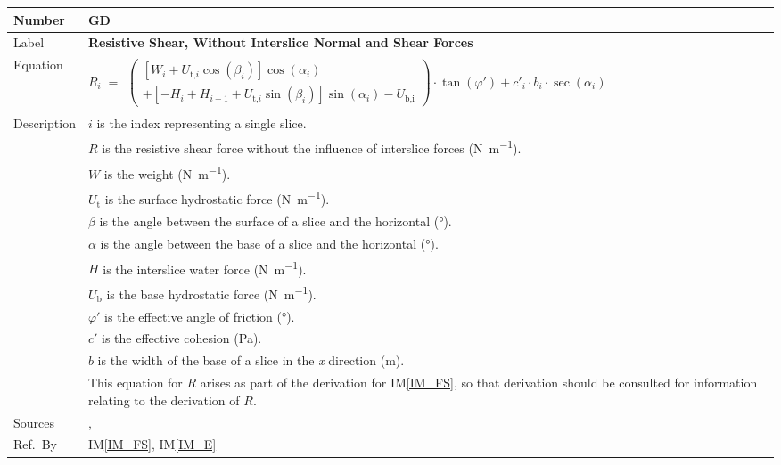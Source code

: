 \documentclass[12pt]{article}
\newcommand{\colAwidth}{0.13\textwidth}
\newcommand{\colBwidth}{0.82\textwidth}
\renewcommand{\arraystretch}{1}
\newcommand{\iref}[1]{IM\ref{#1}}
\newcounter{defnum} %
\begin{document}
\noindent
\begin{minipage}{\textwidth}
	\renewcommand*{\arraystretch}{1.5}
	\begin{tabular}{| p{\colAwidth} | p{\colBwidth} |}
		
		\hline \rowcolor[gray]{0.9} Number&
		GD{defnum}\thedefnum \label{GD_R}\\
		
		\hline Label& \bf Resistive Shear, Without Interslice Normal and Shear 
		Forces \\
		
		\hline
		Equation & 
		$R_i \; = \begin{array}{l}
		\left( \begin{array}{l}
		\left[ W_{i} + U_{\text{t,}i}
		\cos\left(\beta_{i}\right) \right]
		\cos\left(\alpha_{i}\right) \\
		+ \left[ - H_{i} + H_{i-1} +
		U_{\text{t,}i} \sin\left(\beta_{i}\right) \right]
		\sin\left(\alpha_{i}\right) - U_{\text{b,i}} \end{array}
		\right) \cdot \tan\left(\varphi'\right)
		+ c'_{i} \cdot b_{i} \cdot
		\sec\left(\alpha_{i}\right) \end{array} $\\
		
		\hline Description &$i$ is the index representing a single slice.\\
		&$R$ is the resistive shear force without the influence of interslice 
		forces
		(\si{\newton\per\meter}).\\
		&$W$ is the weight (\si{\newton\per\meter}).\\
		&${U_{\text{t}}}$ is the surface hydrostatic force 
		(\si{\newton\per\meter}).\\
		&$\beta{}$ is the angle between the surface of a slice and the 
		horizontal (\si{\degree}).\\
		&$\alpha{}$ is the angle between the base of a slice and the 
		horizontal (\si{\degree}).\\
		&$H$ is the interslice water force (\si{\newton\per\meter}).\\
		&${U_{\text{b}}}$ is the base hydrostatic force 
		(\si{\newton\per\meter}).\\
		&$\varphi{}'$ is the effective angle of friction (\si{\degree}).\\
		&$c'$ is the effective cohesion (Pa).\\
		&$b$ is the width of the base of a slice in the \textit{x} direction 
		(\si{\meter}).\\
		&This equation for $R$ arises as part of the derivation for 
		\iref{IM_FS}, so that derivation should be consulted for information 
		relating to the derivation of $R$.\\
		
		\hline Sources& \cite{ZhuEtAl2005}, \cite{Karchewski2012}\\
		
		\hline Ref.\ By & \iref{IM_FS}, \iref{IM_E}\\
		
		\hline
	\end{tabular}
\end{minipage}\\
\end{document}
